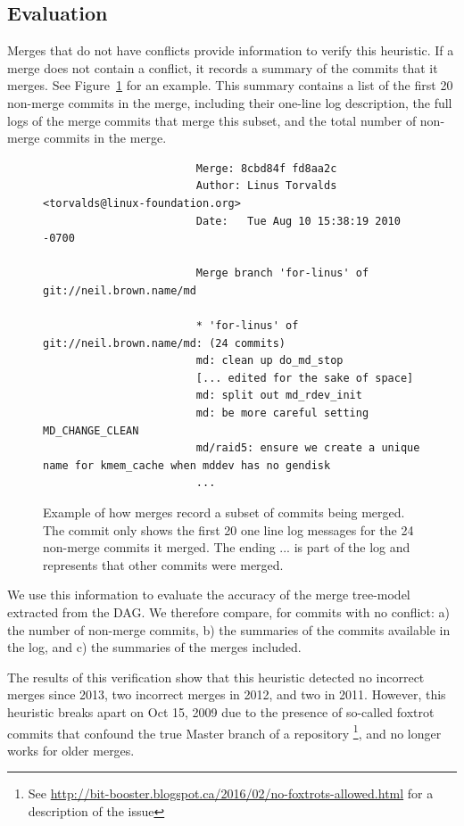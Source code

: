 \documentclass[conference, draftclsnofoot, draft]{IEEEtran}
\begin{document}
\subsection{Evaluation}

Merges that do not have conflicts provide information to verify this heuristic. If a merge does not contain a conflict, it records a summary of the commits that
it merges. See Figure~\ref{fig:sampleMerge} for an example. This summary contains a list of the first 20 non-merge commits in the merge, including their one-line
log description, the full logs of the merge commits that merge this subset, and the total number of non-merge commits in the merge.  

\begin{figure}[htbp]
        \centering
        {\tiny
                \begin{verbatim}
                        Merge: 8cbd84f fd8aa2c
                        Author: Linus Torvalds <torvalds@linux-foundation.org>
                        Date:   Tue Aug 10 15:38:19 2010 -0700

                        Merge branch 'for-linus' of git://neil.brown.name/md

                        * 'for-linus' of git://neil.brown.name/md: (24 commits)
                        md: clean up do_md_stop
                        [... edited for the sake of space]
                        md: split out md_rdev_init
                        md: be more careful setting MD_CHANGE_CLEAN
                        md/raid5: ensure we create a unique name for kmem_cache when mddev has no gendisk
                        ...
                \end{verbatim}}
        \caption{Example of how merges record a subset of commits being merged. The commit only shows the first 20 one line log messages for the 24 non-merge commits
                it merged. The ending ... is part of the log and represents that other commits were merged.}
        \label{fig:sampleMerge}
\end{figure}

We use this information to evaluate the accuracy of the merge tree-model extracted from the DAG. We therefore compare, for commits with no conflict: a) the number of
non-merge commits, b) the summaries of the commits available in the log, and c) the summaries of the merges included.

The results of this verification show that this heuristic detected no incorrect merges since 2013, two incorrect merges in 2012, and two in 2011. However, this
heuristic breaks apart on Oct 15, 2009 due
to the presence of so-called foxtrot commits that confound the true Master branch of a repository \footnote{See \url{http://bit-booster.blogspot.ca/2016/02/no-foxtrots-allowed.html} for a description of the issue}, and no longer works for older merges. 
\end{document}
